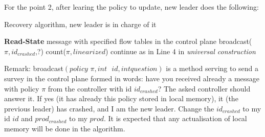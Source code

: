 \documentclass{article}
\begin{document}
For the point 2, after learing the policy to update, new leader does the following:\\
\begin{algorithm}
\caption{Recovery algorithm, new leader is in charge of it}
\begin{algorithmic}[1]
	\State \textbf{Read-State} message with specified flow tables
\EndFor
\State in the control plane broadcast($\pi , id_{crashed}$,?)
	\State count($\pi,linearized$)
	\EndIf
{}
\EndIf 
\State continue as in Line 4 in \emph{universal construction}
\end{algorithmic}
\end{algorithm}

Remark: broadcast$(\textit{policy }\pi, int \textit{ }id,int \textit{question})$ is a method serving to send a survey in the control plane formed in words: have you received already a message with policy $\pi$ from the controller with id $id_{crashed}$? The asked controller should answer it. If yes (it has already this policy stored in local memory), it (the previous leader) has crashed, and I am the new leader. Change the $id_{crashed}$ to my id $id$ and $prod_{crashed}$ to my $prod$.
It is expected that any actualisation of local memory will be done in the algorithm.
\end{document}
